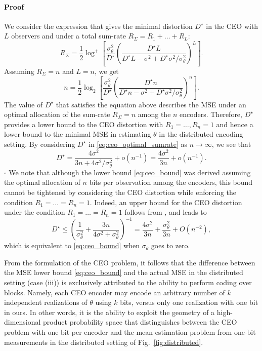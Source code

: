 \documentclass[letterpaper, conference, 11pt]{IEEEtran}      %
\newenvironment{proof}{\paragraph*{Proof}}{\hfill$\square$ \newline}
\begin{document}
\begin{proof}
We consider the expression \cite[Eq. 10]{chen2004upper} that gives the minimal distortion $D^\star$ in the CEO with $L$ observers and under a total sum-rate $R_\Sigma = R_1 + \ldots +R_L$:
\begin{equation} \label{eq:ceo_optimal_sumrate}
R_{\Sigma} = \frac{1}{2} \log^+ \left[ \frac{\sigma_\theta^2}{D^\star} \left( \frac{D^\star L}{ D^\star L - \sigma^2 + D^\star \sigma^2 / \sigma_\theta^2 }\right)^L  \right].
\end{equation}
Assuming $R_\Sigma = n$ and $L=n$, we get
\begin{equation} \label{eq:ceo_optimal_sumrate}
n = \frac{1}{2} \log_2 \left[ \frac{\sigma_\theta^2}{D^\star} \left(\frac{ D^\star n }{D^\star n - \sigma^2 + D^\star \sigma^2/\sigma_\theta^2 }  \right)^n  \right].
\end{equation}
The value of $D^\star$ that satisfies the equation above describes the MSE under an optimal allocation of the sum-rate $R_\Sigma = n$ among the $n$ encoders. Therefore, $D^\star$ provides a lower bound to the CEO distortion with $R_1=\ldots,R_n = 1$ and hence a lower bound to the minimal MSE in estimating $\theta$ in the distributed encoding setting. By considering $D^\star$ in \eqref{eq:ceo_optimal_sumrate} as $n\rightarrow \infty$, we see that 
\[
D^\star = \frac{ 4\sigma^2 }{3n + 4 \sigma^2 / \sigma_\theta^2 } + o(n^{-1}) =  \frac{4\sigma^2}{3n} + o(n^{-1}). 
\]
\end{proof}
We note that although the lower bound \eqref{eq:ceo_bound} was derived assuming the optimal allocation of $n$ bits per observation among the encoders, this bound cannot be tightened by considering the CEO distortion while enforcing the condition $R_1=\ldots = R_n = 1$. Indeed, an upper bound for the CEO distortion under the condition $R_1=\ldots = R_n = 1$ follows from \cite{KipnisRini2017}, and leads to
\[
D^\star \leq  \left( \frac{1}{\sigma_\theta^2} +  \frac{3n}{4\sigma^2 + \sigma_\theta^2} \right)^{-1}   =
\frac{4 \sigma^2}{3n} +  \frac{\sigma_\theta^2}{3n} + O(n^{-2}),
\]
which is equivalent to \eqref{eq:ceo_bound} when $\sigma_\theta$ goes to zero. \par
From the formulation of the CEO problem, it follows that the difference between the MSE lower bound \eqref{eq:ceo_bound} and the actual MSE in the distributed setting (case (iii)) is exclusively attributed  to the ability to perform coding over blocks. Namely, each CEO encoder may encode an arbitrary number of $k$ independent realizations of $\theta$ using $k$ bits, versus only one realization with one bit in ours. In other words, it is the ability to exploit the geometry of a high-dimensional product probability space that 
distinguishes between the CEO problem with one bit per encoder and the mean estimation problem from one-bit measurements in the distributed setting of Fig.~\ref{fig:distributed}. 
\end{document}
